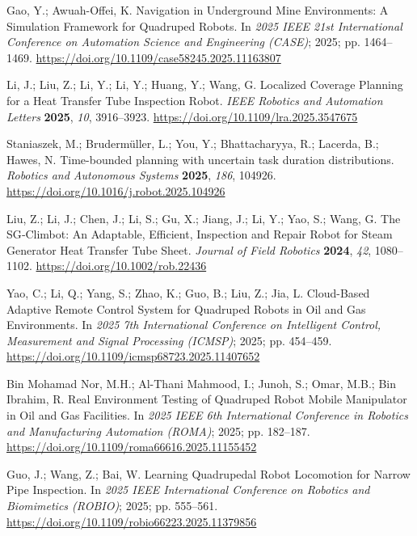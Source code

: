 Gao, Y.; Awuah-Offei, K. Navigation in Underground Mine Environments: A Simulation Framework for Quadruped Robots. In \emph{2025 IEEE 21st International Conference on Automation Science and Engineering (CASE)}; 2025; pp. 1464--1469. \url{https://doi.org/10.1109/case58245.2025.11163807}

Li, J.; Liu, Z.; Li, Y.; Li, Y.; Huang, Y.; Wang, G. Localized Coverage Planning for a Heat Transfer Tube Inspection Robot. \emph{IEEE Robotics and Automation Letters} \textbf{2025}, \emph{10}, 3916--3923. \url{https://doi.org/10.1109/lra.2025.3547675}

Staniaszek, M.; Brudermüller, L.; You, Y.; Bhattacharyya, R.; Lacerda, B.; Hawes, N. Time-bounded planning with uncertain task duration distributions. \emph{Robotics and Autonomous Systems} \textbf{2025}, \emph{186}, 104926. \url{https://doi.org/10.1016/j.robot.2025.104926}

Liu, Z.; Li, J.; Chen, J.; Li, S.; Gu, X.; Jiang, J.; Li, Y.; Yao, S.; Wang, G. The SG‐Climbot: An Adaptable, Efficient, Inspection and Repair Robot for Steam Generator Heat Transfer Tube Sheet. \emph{Journal of Field Robotics} \textbf{2024}, \emph{42}, 1080--1102. \url{https://doi.org/10.1002/rob.22436}

Yao, C.; Li, Q.; Yang, S.; Zhao, K.; Guo, B.; Liu, Z.; Jia, L. Cloud-Based Adaptive Remote Control System for Quadruped Robots in Oil and Gas Environments. In \emph{2025 7th International Conference on Intelligent Control, Measurement and Signal Processing (ICMSP)}; 2025; pp. 454--459. \url{https://doi.org/10.1109/icmsp68723.2025.11407652}

Bin Mohamad Nor, M.H.; Al-Thani Mahmood, I.; Junoh, S.; Omar, M.B.; Bin Ibrahim, R. Real Environment Testing of Quadruped Robot Mobile Manipulator in Oil and Gas Facilities. In \emph{2025 IEEE 6th International Conference in Robotics and Manufacturing Automation (ROMA)}; 2025; pp. 182--187. \url{https://doi.org/10.1109/roma66616.2025.11155452}

Guo, J.; Wang, Z.; Bai, W. Learning Quadrupedal Robot Locomotion for Narrow Pipe Inspection. In \emph{2025 IEEE International Conference on Robotics and Biomimetics (ROBIO)}; 2025; pp. 555--561. \url{https://doi.org/10.1109/robio66223.2025.11379856}

